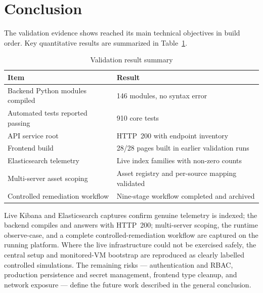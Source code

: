 \section{Conclusion}

The validation evidence shows \project{} reached its main technical objectives in build order. Key quantitative results are summarized in Table~\ref{tab:val-summary}.

\begin{table}[H]
\centering
\caption{Validation result summary}
\label{tab:val-summary}
\begin{tabularx}{\textwidth}{@{}p{}X@{}}
\toprule
\textbf{Item} & \textbf{Result} \\
\midrule
Backend Python modules compiled & 146 modules, no syntax error \\
Automated tests reported passing & 910 core tests \\
API service root & HTTP~200 with endpoint inventory \\
Frontend build & 28/28 pages built in earlier validation runs \\
Elasticsearch telemetry & Live index families with non-zero counts \\
Multi-server asset scoping & Asset registry and per-source mapping validated \\
Controlled remediation workflow & Nine-stage workflow completed and archived \\
\bottomrule
\end{tabularx}
\end{table}

Live Kibana and Elasticsearch captures confirm genuine telemetry is indexed; the backend compiles and answers with HTTP~200; multi-server scoping, the runtime observe-case, and a complete controlled-remediation workflow are captured on the running platform. Where the live infrastructure could not be exercised safely, the central setup and monitored-VM bootstrap are reproduced as clearly labelled controlled simulations. The remaining risks --- authentication and RBAC, production persistence and secret management, frontend type cleanup, and network exposure --- define the future work described in the general conclusion.
